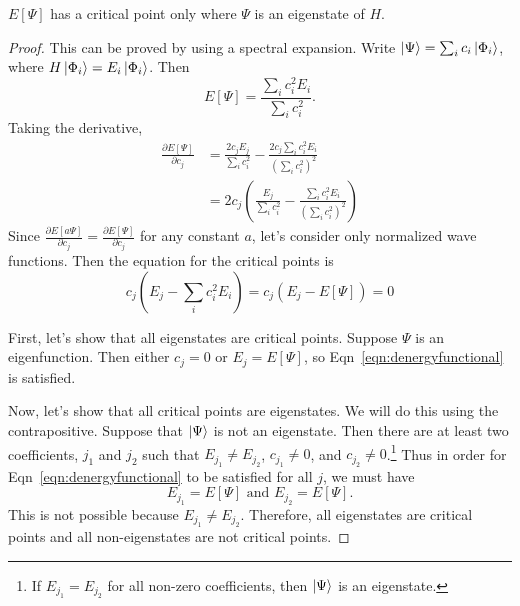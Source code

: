 \begin{theorem}
\label{theorem:criticalpoint}
$E[\Psi]$ has a critical point only where $\Psi$ is an eigenstate of $H$.
\end{theorem}
\begin{proof}
This can be proved by using a spectral expansion. 
Write $\ket{\Psi} = \sum_i c_i \ket{\Phi_i}$, where $H\ket{\Phi_i}=E_i\ket{\Phi_i}$. 
Then 
\begin{equation}
E[\Psi] = \frac{\sum_i c_i^2 E_i}{\sum_i c_i^2}.
\end{equation}
Taking the derivative, 
\begin{align}
\frac{\partial E[\Psi]}{\partial c_j } &= \frac{2 c_j E_j}{\sum_i c_i^2} - \frac{2c_j \sum_i c_i^2 E_i}{(\sum_i c_i^2)^2} \\
&= 2c_j \left(\frac{E_j}{\sum_i c_i^2} - \frac{\sum_i c_i^2 E_i}{(\sum_i c_i^2)^2}\right) 
\end{align}
Since $\frac{\partial E[a\Psi]}{\partial c_j } = \frac{\partial E[\Psi]}{\partial c_j }$ for any constant $a$, let's consider only normalized wave functions.
Then the equation for the critical points is 
\begin{equation}
c_j\left(E_j - \sum_i c_i^2 E_i\right) = c_j (E_j - E[\Psi]) = 0	
\label{eqn:denergyfunctional}
\end{equation}


First, let's show that all eigenstates are critical points. 
Suppose $\Psi$ is an eigenfunction. 
Then either $c_j=0$ or $E_j = E[\Psi]$, so Eqn~\ref{eqn:denergyfunctional} is satisfied.  


Now, let's show that all critical points are eigenstates. 
We will do this using the contrapositive.
Suppose that $\ket{\Psi}$ is not an eigenstate. 
Then there are at least two coefficients, $j_1$ and $j_2$ such that $E_{j_1} \neq E_{j_2}$, $c_{j_1}\neq 0$, and $c_{j_2}\neq 0$.\footnote{If  $E_{j_1} = E_{j_2}$ for all non-zero coefficients, then $\ket{\Psi}$ is an eigenstate.}
Thus in order for Eqn~\ref{eqn:denergyfunctional} to be satisfied for all $j$, we must have 
\begin{equation}
E_{j_1} = E[\Psi] \text{ and } E_{j_2} = E[\Psi].
\end{equation}
This is not possible because $E_{j_1} \neq E_{j_2}$. 
Therefore, all eigenstates are critical points and all non-eigenstates are not critical points.
\end{proof}


